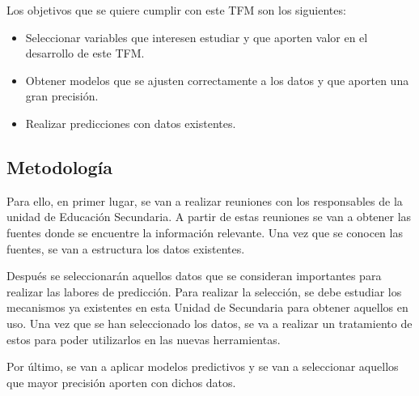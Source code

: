 Los objetivos que se quiere cumplir con este TFM son los siguientes:
\begin{itemize}
	\item Seleccionar variables que interesen estudiar y que aporten valor en el desarrollo de este TFM.
	\item Obtener modelos que se ajusten correctamente a los datos y que aporten una gran precisión.
	\item Realizar predicciones con datos existentes.
\end{itemize}

\subsection{Metodología}

Para ello, en primer lugar, se van a realizar reuniones con los responsables de la unidad de Educación Secundaria. A partir de estas reuniones se van a obtener las fuentes donde se encuentre la información relevante. Una vez que se conocen las fuentes, se van a estructura los datos existentes.

Después se seleccionarán aquellos datos que se consideran importantes para realizar las labores de predicción. Para realizar la selección, se debe estudiar los mecanismos ya existentes en esta Unidad de Secundaria para obtener aquellos en uso. Una vez que se han seleccionado los datos, se va a realizar un tratamiento de estos para poder utilizarlos en las nuevas herramientas.

Por último, se van a aplicar modelos predictivos y se van a seleccionar aquellos que mayor precisión aporten con dichos datos.

